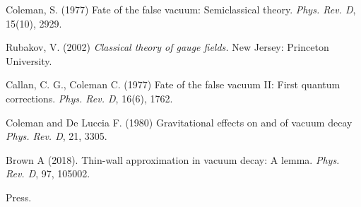 \documentclass[a0,portrait]{a0poster}
\begin{document}
\begin{multicols}{3}
\begin{thebibliography}{9}
Coleman, S. (1977) 
Fate of the false vacuum: Semiclassical theory.
\textit{Phys. Rev. D}, 15(10), 2929.

Rubakov, V. (2002) 
\textit{Classical theory of gauge fields.}
New Jersey: Princeton University.

Callan, C. G., Coleman C. (1977) 
Fate of the false vacuum II: First quantum corrections.
\textit{Phys. Rev. D}, 16(6), 1762.

Coleman and De Luccia F. (1980) 
Gravitational effects on and of vacuum decay
\textit{Phys. Rev. D}, 21, 3305.

Brown A (2018). 
Thin-wall approximation in vacuum decay: A lemma.
\textit{Phys. Rev. D}, 97, 105002.


	Press.
\end{thebibliography}

\end{multicols}
\end{document}
